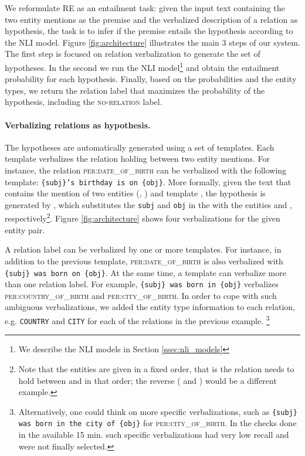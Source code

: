 \documentclass[11pt]{article}
\begin{document}
We reformulate RE as an entailment task: given the input text containing the two entity mentions as the premise and the verbalized description of a relation as hypothesis, the task is to infer if the premise entails the hypothesis according to the NLI model. 
Figure \ref{fig:architecture} illustrates the main 3 steps of our system. The first step is focused on relation verbalization to generate the set of hypotheses. In the second we run the NLI model\footnote{We describe the NLI models in Section \ref{ssec:nli_models}} and obtain the entailment probability for each hypothesis. Finally, based on the probabilities and the entity types, we return the relation label that maximizes the probability of the hypothesis, including the \textsc{no-relation} label.



\paragraph{Verbalizing relations as hypothesis.}
The hypotheses are automatically generated using a set of templates. Each template verbalizes the relation holding between two entity mentions. 
For instance, the relation \textsc{per:date\_of\_birth} can be verbalized with the following template: \texttt{\{subj\}'s birthday is on \{obj\}}. More formally, given the text  that contains the mention of two entities (, ) and template , the hypothesis  is generated by , which substitutes the \texttt{subj} and \texttt{obj} in the  with the entities  and , respectively\footnote{Note that the entities are given in a fixed order, that is the relation needs to hold between   and  in that order; the reverse ( and ) would be a different example.}. 
Figure \ref{fig:architecture} shows four verbalizations for the given entity pair. 

A relation label can be verbalized by one or more templates. For instance, in addition to the previous template, \textsc{per:date\_of\_birth} is also verbalized with \texttt{\{subj\} was born on \{obj\}}. 
At the same time, a template can verbalize more than one relation label. For example, \texttt{\{subj\} was born in \{obj\}} verbalizes \textsc{per:country\_of\_birth} and \textsc{per:city\_of\_birth}. 
In order to cope with such ambiguous verbalizations, we added the entity type information to each relation, e.g. \texttt{COUNTRY} and \texttt{CITY}  for each of the relations in the previous example. 
\footnote{Alternatively, one could think on more specific verbalizations, such as  \texttt{\{subj\} was born in the city of \{obj\}} for \textsc{per:city\_of\_birth}. In the checks done in the available 15 min. such specific verbalizations had very low recall and were not finally selected.} 
\end{document}
